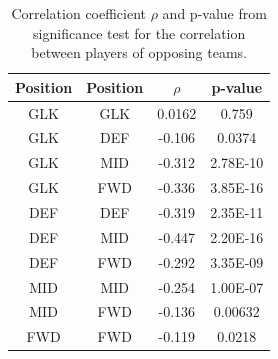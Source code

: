 \begin{table}[H]
\centering
\begin{tabular}{|c|c|c|c|}
\hline
Position & Position & $\rho$ & p-value  \\
\hline
GLK      & GLK      & 0.0162 & 0.759    \\
GLK      & DEF      & -0.106 & 0.0374   \\
GLK      & MID      & -0.312 & 2.78E-10 \\
GLK      & FWD      & -0.336 & 3.85E-16 \\
DEF      & DEF      & -0.319 & 2.35E-11 \\
DEF      & MID      & -0.447 & 2.20E-16 \\
DEF      & FWD      & -0.292 & 3.35E-09 \\
MID      & MID      & -0.254 & 1.00E-07 \\
MID      & FWD      & -0.136 & 0.00632 \\
FWD      & FWD      & -0.119 & 0.0218  \\
\hline
\end{tabular}
\caption{Correlation coefficient $\rho$ and p-value from significance test for the correlation between players of opposing teams.}
\label{tab:cor_opp}
\end{table}